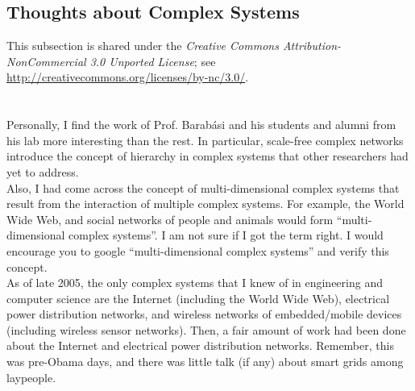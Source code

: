 \subsection{\hspace{0.1in} Thoughts about Complex Systems}
\label{complexsystemsthoughts}

This subsection is shared under the {\it Creative Commons Attribution-NonCommercial 3.0 Unported License}; see \url{http://creativecommons.org/licenses/by-nc/3.0/}. \\
\ \\
\ \\
Personally, I find the work of Prof. Barab{\'{a}}si and his students and alumni from his lab more interesting than the rest. In particular, scale-free complex networks introduce the concept of hierarchy in complex systems that other researchers had yet to address. \\

Also, I had come across the concept of multi-dimensional complex systems that result from the interaction of multiple complex systems. For example, the World Wide Web, and social networks of people and animals would form ``multi-dimensional complex systems''. I am not sure if I got the term right. I would encourage you to google ``multi-dimensional complex systems'' and verify this concept. \\

As of late 2005, the only complex systems that I knew of in engineering and computer science are the Internet (including the World Wide Web), electrical power distribution networks, and wireless networks of embedded/mobile devices (including wireless sensor networks). Then, a fair amount of work had been done about the Internet and electrical power distribution networks. Remember, this was pre-Obama days, and there was little talk (if any) about smart grids among laypeople.  \\

